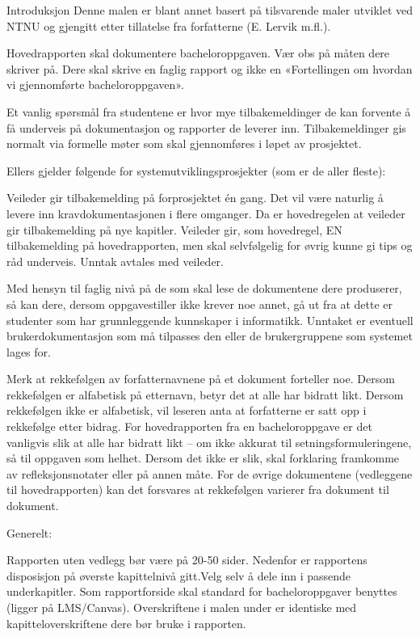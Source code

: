 Introduksjon
Denne malen er blant annet basert på tilsvarende maler utviklet ved NTNU og gjengitt etter tillatelse fra forfatterne (E. Lervik m.fl.).

Hovedrapporten skal dokumentere bacheloroppgaven. Vær obs på måten dere skriver på. Dere skal skrive en faglig rapport og ikke en «Fortellingen om hvordan vi gjennomførte bacheloroppgaven».

Et vanlig spørsmål fra studentene er hvor mye tilbakemeldinger de kan forvente å få underveis på dokumentasjon og rapporter de leverer inn. Tilbakemeldinger gis normalt via formelle møter som skal gjennomføres i løpet av prosjektet.

Ellers gjelder følgende for systemutviklingsprosjekter (som er de aller fleste):

Veileder gir tilbakemelding på forprosjektet én gang.
Det vil være naturlig å levere inn kravdokumentasjonen i flere omganger. Da er hovedregelen at veileder gir tilbakemelding på nye kapitler.
Veileder gir, som hovedregel, EN tilbakemelding på hovedrapporten, men skal selvfølgelig for øvrig kunne gi tips og råd underveis.
Unntak avtales med veileder.

Med hensyn til faglig nivå på de som skal lese de dokumentene dere produserer, så kan dere, dersom oppgavestiller ikke krever noe annet, gå ut fra at dette er studenter som har grunnleggende kunnskaper i informatikk. Unntaket er eventuell brukerdokumentasjon som må tilpasses den eller de brukergruppene som systemet lages for.

Merk at rekkefølgen av forfatternavnene på et dokument forteller noe. Dersom rekkefølgen er alfabetisk på etternavn, betyr det at alle har bidratt likt. Dersom rekkefølgen ikke er alfabetisk, vil leseren anta at forfatterne er satt opp i rekkefølge etter bidrag. For hovedrapporten fra en bacheloroppgave er det vanligvis slik at alle har bidratt likt – om ikke akkurat til setningsformuleringene, så til oppgaven som helhet. Dersom det ikke er slik, skal forklaring framkomme av refleksjonsnotater eller på annen måte. For de øvrige dokumentene (vedleggene til hovedrapporten) kan det forsvares at rekkefølgen varierer fra dokument til dokument.

Generelt:

Rapporten uten vedlegg bør være på 20-50 sider.
Nedenfor er rapportens disposisjon på øverste kapittelnivå gitt.Velg selv å dele inn i passende underkapitler.
Som rapportforside skal standard for bacheloroppgaver benyttes (ligger på LMS/Canvas).
Overskriftene i malen under er identiske med kapitteloverskriftene dere bør bruke i rapporten.

